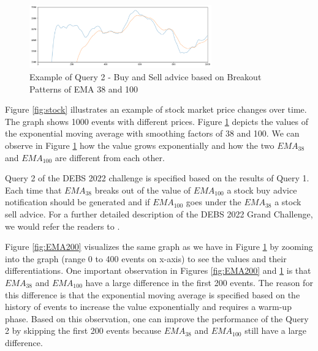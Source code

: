 \begin{figure}[!ht]
    \begin{center}
        \includegraphics[width=0.70\textwidth]{./images/query2_example.png}
        \caption{Example of Query 2 - Buy and Sell advice based on Breakout Patterns of EMA 38 and 100 }
        \label{fig:EMAs}
    \end{center}
\end{figure}


Figure \ref{fig:stock} illustrates an example of stock market price changes over time. The graph shows 1000 events with
different prices. Figure \ref{fig:EMAs} depicts the values of the exponential moving average with
smoothing factors of 38 and 100. We can observe in Figure \ref{fig:EMAs} how the value grows exponentially
and how the two $EMA_{38}$ and $EMA_{100}$ are different from each other.

Query 2 of the DEBS 2022 challenge \cite{debs2022challenge} is specified based on the results of Query 1. Each time
that $EMA_{38}$ breaks out of the value of $EMA_{100}$ a stock buy advice notification should be generated and if
$EMA_{100}$ goes under the $EMA_{38}$ a stock sell advice. For a further detailed description of the DEBS 2022
Grand Challenge, we would refer the readers to \cite{debs2022challenge}.

Figure \ref{fig:EMA200} visualizes the same graph as we have in Figure \ref{fig:EMAs} by
zooming into the graph (range 0 to 400 events on x-axis) to see the values and their differentiations. One important observation in
Figures \ref{fig:EMA200} and \ref{fig:EMAs} is that $EMA_{38}$ and $EMA_{100}$ have a large difference in the first
200 events.  The reason for this difference is that the exponential moving average is specified based
on the history of events to increase the value exponentially and requires a warm-up phase. Based on this observation,
one can improve the performance of the Query 2 by skipping the first 200 events because
$EMA_{38}$ and $EMA_{100}$ still have a large difference.

